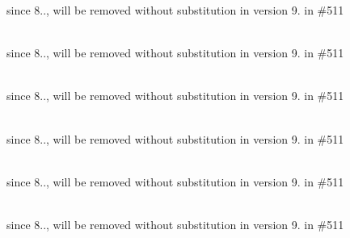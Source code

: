 \begin{DoxyRefList}
\label{deprecated__deprecated000416}%
%
since 8.., will be removed without substitution in version 9. in \#511  
\item[Global \doxylink{class_sabberworm_1_1_c_s_s_1_1_rule_set_1_1_declaration_block_a38a4285e655b2709474a8b7496b69110}{Declaration\+Block\+::create\+Shorthand\+Properties} (array \$a\+Properties, \$s\+Shorthand)]\hfill \\
\label{deprecated__deprecated000414}%
%
since 8.., will be removed without substitution in version 9. in \#511  
\item[Global \doxylink{class_sabberworm_1_1_c_s_s_1_1_rule_set_1_1_declaration_block_a02455b5dac22d0760454fc03c0880feb}{Declaration\+Block\+::create\+Shorthands} ()]\hfill \\
\label{deprecated__deprecated000408}%
%
since 8.., will be removed without substitution in version 9. in \#511  
\item[Global \doxylink{class_sabberworm_1_1_c_s_s_1_1_rule_set_1_1_declaration_block_a1cac087bf8c9c2a7c9b943aee3febbf4}{Declaration\+Block\+::expand\+Background\+Shorthand} ()]\hfill \\
\label{deprecated__deprecated000412}%
%
since 8.., will be removed without substitution in version 9. in \#511  
\item[Global \doxylink{class_sabberworm_1_1_c_s_s_1_1_rule_set_1_1_declaration_block_a9dd0036775357fd3c53cafaa10f45b55}{Declaration\+Block\+::expand\+Border\+Shorthand} ()]\hfill \\
\label{deprecated__deprecated000409}%
%
since 8.., will be removed without substitution in version 9. in \#511  
\item[Global \doxylink{class_sabberworm_1_1_c_s_s_1_1_rule_set_1_1_declaration_block_a9ecde3bc4b8030c61ee2fc2a151728d7}{Declaration\+Block\+::expand\+Dimensions\+Shorthand} ()]\hfill \\
\label{deprecated__deprecated000410}%
%
since 8.., will be removed without substitution in version 9. in \#511  
\item[Global \doxylink{class_sabberworm_1_1_c_s_s_1_1_rule_set_1_1_declaration_block_ac04ad57b57030456e7e2b9e456a7dc42}{Declaration\+Block\+::expand\+Font\+Shorthand} ()]\hfill \\
\label{deprecated__deprecated000411}%

\end{DoxyRefList}
